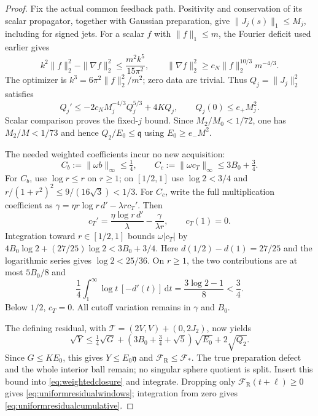 \documentclass[11pt]{article}
\numberwithin{equation}{section}
\newcommand{\dd}{\,\mathrm d}
\begin{document}
\begin{proof}
Fix the actual common feedback path. Positivity and conservation of its
scalar propagator, together with Gaussian preparation, give
$\|J_j(s)\|_1\le M_j$, including for signed jets. For a scalar $f$
with $\|f\|_1\le m$, the Fourier deficit used earlier gives
\[
 k^2\|f\|_2^2-\|\nabla f\|_2^2
 \le\frac{m^2k^5}{15\pi^2},\qquad
 \|\nabla f\|_2^2\ge c_N\|f\|_2^{10/3}m^{-4/3}.
\]
The optimizer is $k^3=6\pi^2\|f\|_2^2/m^2$; zero data are trivial.
Thus $Q_j=\|J_j\|_2^2$ satisfies
\[
 Q_j'\le-2c_NM_j^{-4/3}Q_j^{5/3}+4KQ_j,
 \qquad Q_j(0)\le e_+M_j^2.
\]
Scalar comparison proves the fixed-$j$ bound. Since
$M_2/M_0<1/72$, one has $M_2/M<1/73$ and hence
$Q_2/E_0\le\mathfrak q$ using $E_0\ge e_-M^2$.

The needed weighted coefficients incur no new acquisition:
\begin{equation}\label{eq:uniformresidualcoefficients}
 C_b:=\|\omega b\|_\infty\le\tfrac14,\qquad
 C_c:=\|\omega c_T\|_\infty\le3B_0+\tfrac34.
\end{equation}
For $C_b$, use $\log r\le r$ on $r\ge1$; on $[1/2,1]$ use
$\log2<3/4$ and $r/(1+r^2)^2\le9/(16\sqrt3)<1/3$.
For $C_c$, write the full multiplication coefficient as
$\gamma=\eta r\log r\,d'-\lambda r c_T'$. Then
\[
 c_T'=\frac{\eta\log r\,d'}{\lambda}
                  -\frac{\gamma}{\lambda r},\qquad c_T(1)=0.
\]
Integration toward $r\in[1/2,1]$ bounds $\omega|c_T|$ by
$4B_0\log2+(27/25)\log2<3B_0+3/4$.
Here $d(1/2)-d(1)=27/25$ and the logarithmic series gives
$\log2<25/36$. On $r\ge1$, the two contributions are at most
$5B_0/8$ and
\[
 \frac14\int_1^\infty\log t\,[-d'(t)]\dd t
       =\frac{3\log2-1}{8}<\frac34.
\]
Below $1/2$, $c_T=0$. All cutoff variation remains in $\gamma$ and $B_0$.

The defining residual, with
$\mathcal T=(2V,V)+(0,2J_2)$, now yields
\begin{equation}\label{eq:uniformresidualidentity}
 \sqrt Y\le\tfrac14\sqrt G+
       (3B_0+\tfrac34+\sqrt5)\sqrt{E_0}+2\sqrt{Q_2}.
\end{equation}
Since $G\le KE_0$, this gives $Y\le E_0\mathfrak y$ and
$\mathcal F_{\mathrm R}\le\mathcal F_*$. The true preparation defect
and the whole interior ball remain; no singular sphere quotient is split.
Insert this bound into \eqref{eq:weightedclosure} and integrate.
Dropping only $\mathcal F_{\mathrm R}(t+\ell)\ge0$ gives
\eqref{eq:uniformresidualwindows}; integration from zero gives
\eqref{eq:uniformresidualcumulative}.
\end{proof}
\end{document}
